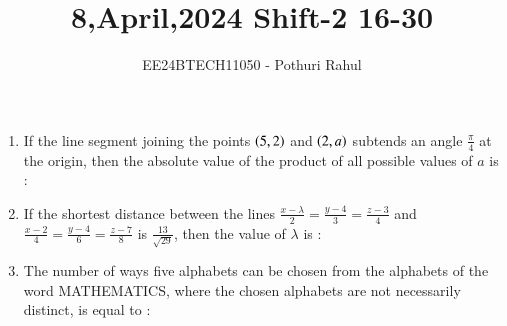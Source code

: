 \documentclass[journal]{IEEEtran}
\begin{document}

\vspace{3cm}
\title{8,April,2024 Shift-2 16-30}
\author{EE24BTECH11050 - Pothuri Rahul}
{\let\newpage\relax\maketitle}
\renewcommand{\thefigure}{\theenumi}
\renewcommand{\thetable}{\theenumi}
\setlength{\intextsep}{10pt} %
\renewcommand{\thetable}{\theenumi}
\begin{enumerate}[start=16]
\item %
If the line segment joining the points $\left(5,2\right)$ and $\left(2,a\right)$ subtends an angle $\frac{\pi}{4}$ at the origin, then the absolute value of the product of all possible values of $a$ is :
\begin{enumerate}
\end{enumerate}
\item %
If the shortest distance between the lines $\frac{x - \lambda}{2} = \frac{y - 4}{3} = \frac{z - 3}{4}$ and $\frac{x - 2}{4} = \frac{y - 4}{6} = \frac{z - 7}{8}$ is $\frac{13}{\sqrt{29}}$, then the value of $\lambda$ is :
\begin{enumerate}
\end{enumerate}
\item %
The number of ways five alphabets can be chosen from the alphabets of the word MATHEMATICS, where the chosen alphabets are not necessarily distinct, is equal to :

\end{enumerate}
\end{document}

